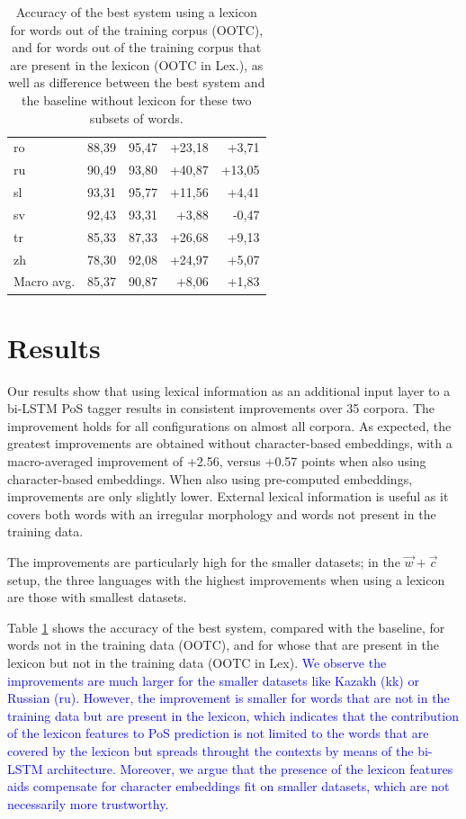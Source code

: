 \documentclass[11pt,a4paper]{article}
\begin{document}
\begin{table}[th]
\begin{tabular}{lrrrr}
ro & 88,39 & 95,47 & +23,18 & +3,71\\
ru & 90,49 & 93,80 & +40,87 & +13,05\\
sl & 93,31 & 95,77 & +11,56 & +4,41\\
sv & 92,43 & 93,31 & +3,88 & -0,47\\
tr & 85,33 & 87,33 & +26,68 & +9,13\\
zh & 78,30 & 92,08 & +24,97 & +5,07\\
\midrule
Macro avg. & 85,37 & 90,87 & +8,06 & +1,83\\
\bottomrule
\end{tabular}
\caption{Accuracy of the best system using a lexicon for words out of the training corpus (OOTC), and for words out of the training corpus that are present in the lexicon (OOTC in Lex.), as well as difference between the best system and the baseline without lexicon for these two subsets of words. \label{tbl:acc_oov}}
\end{table}


\section{Results}

Our results show that using lexical information as an additional input layer to a bi-LSTM PoS tagger results in
consistent improvements over 35 corpora. The improvement holds for all configurations on almost all corpora. As
expected, the greatest improvements are obtained without character-based embeddings, with a macro-averaged improvement
of +2.56, versus +0.57 points when also using character-based embeddings. When also using pre-computed embeddings,
improvements are only slightly lower. External lexical information is useful as it covers both words with an irregular
morphology and words not present in the training data.

The improvements are particularly high for the smaller datasets; in the $\vec{w}+\vec{c}$ setup, the three
languages with the highest improvements when using a lexicon are those with smallest datasets.

Table \ref{tbl:acc_oov} shows the accuracy of the best system, compared with the baseline, for words not in the training data (OOTC), and for whose that are present in the lexicon but not in the training data (OOTC in Lex). \textcolor{blue}{We observe the improvements are much larger for the smaller datasets like Kazakh (kk) or Russian (ru). However, the improvement is smaller for words that are not in the training data but are present in the lexicon, which indicates that the contribution of the lexicon features to PoS prediction is not limited to the words that are covered by the lexicon but spreads throught the contexts by means of the bi-LSTM architecture. Moreover, we argue that the presence of the lexicon features aids compensate for character embeddings fit on smaller datasets, which are not necessarily more trustworthy. }
\end{document}
